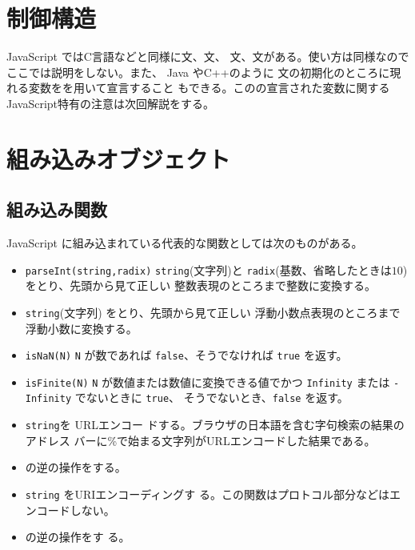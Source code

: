 \section{制御構造}
JavaScript ではC言語などと同様に文、文、
文、文がある。使い方は同様なのでここでは説明をしない。また、
Java やC++のように
文の初期化のところに現れる変数をを用いて宣言すること
もできる。このの宣言された変数に関するJavaScript特有の注意は次回解説をする。
\section{組み込みオブジェクト}
\subsection{組み込み関数}
JavaScript に組み込まれている代表的な関数としては次のものがある。
\begin{itemize}
 \item \Verb+parseInt(string,radix)+ \Verb+string+(文字列)と
       \Verb+radix+(基数、省略したときは$10$)をとり、先頭から見て正しい
       整数表現のところまで整数に変換する。
 \item {} \Verb+string+(文字列)
       をとり、先頭から見て正しい
       浮動小数点表現のところまで浮動小数に変換する。
 \item \Verb+isNaN(N)+ \Verb+N+ が数であれば \Verb+false+、そうでなければ
       \Verb+true+ を返す。
 \item \Verb+isFinite(N)+ \Verb+N+ が数値または数値に変換できる値でかつ
       \Verb+Infinity+ または \Verb+-Infinity+ でないときに \Verb+true+、
       そうでないとき、\Verb+false+ を返す。
 \item {} \texttt{string}を URLエンコー
			 ドする。ブラウザの日本語を含む字句検索の結果のアドレス
			 バーに\%で始まる文字列がURLエンコードした結果である。 
 \item {}
			 の逆の操作をする。
 \item {} \texttt{string} をURIエンコーディングす
			 る。この関数はプロトコル部分などはエンコードしない。
 \item {}  の逆の操作をす
			 る。
\end{itemize}
